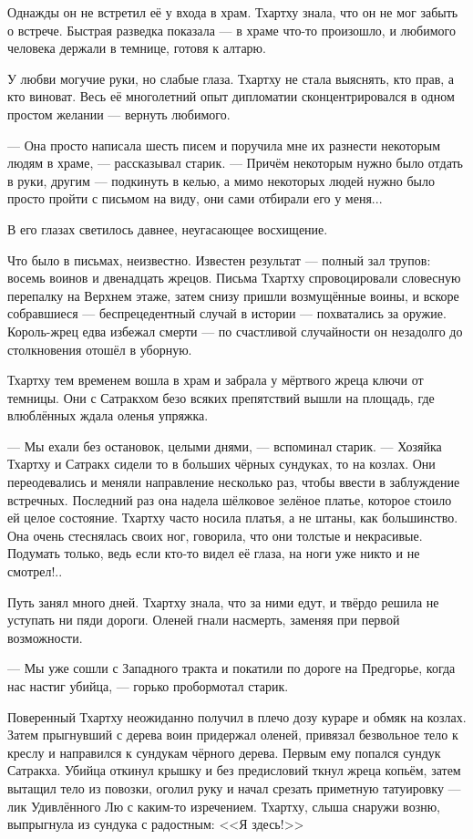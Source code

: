 Однажды он не встретил её у входа в храм.
Тхартху знала, что он не мог забыть о встрече.
Быстрая разведка показала --- в храме что-то произошло, и любимого человека держали в темнице, готовя к алтарю.

У любви могучие руки, но слабые глаза.
Тхартху не стала выяснять, кто прав, а кто виноват.
Весь её многолетний опыт дипломатии сконцентрировался в одном простом желании --- вернуть любимого.

--- Она просто написала шесть писем и поручила мне их разнести некоторым людям в храме, --- рассказывал старик.
--- Причём некоторым нужно было отдать в руки, другим --- подкинуть в келью, а мимо некоторых людей нужно было просто пройти с письмом на виду, они сами отбирали его у меня...

В его глазах светилось давнее, неугасающее восхищение.

Что было в письмах, неизвестно.
Известен результат --- полный зал трупов: восемь воинов и двенадцать жрецов.
Письма Тхартху спровоцировали словесную перепалку на Верхнем этаже, затем снизу пришли возмущённые воины, и вскоре собравшиеся --- беспрецедентный случай в истории --- похватались за оружие.
Король-жрец едва избежал смерти --- по счастливой случайности он незадолго до столкновения отошёл в уборную.

Тхартху тем временем вошла в храм и забрала у мёртвого жреца ключи от темницы.
Они с Сатракхом безо всяких препятствий вышли на площадь, где влюблённых ждала оленья упряжка.

--- Мы ехали без остановок, целыми днями, --- вспоминал старик.
--- Хозяйка Тхартху и Сатракх сидели то в больших чёрных сундуках, то на козлах.
Они переодевались и меняли направление несколько раз, чтобы ввести в заблуждение встречных.
Последний раз она надела шёлковое зелёное платье, которое стоило ей целое состояние.
Тхартху часто носила платья, а не штаны, как большинство.
Она очень стеснялась своих ног, говорила, что они толстые и некрасивые.
Подумать только, ведь если кто-то видел её глаза, на ноги уже никто и не смотрел!..

Путь занял много дней.
Тхартху знала, что за ними едут, и твёрдо решила не уступать ни пяди дороги.
Оленей гнали насмерть, заменяя при первой возможности.

--- Мы уже сошли с Западного тракта и покатили по дороге на Предгорье, когда нас настиг убийца, --- горько пробормотал старик.

Поверенный Тхартху неожиданно получил в плечо дозу кураре и обмяк на козлах.
Затем прыгнувший с дерева воин придержал оленей, привязал безвольное тело к креслу и направился к сундукам чёрного дерева.
Первым ему попался сундук Сатракха.
Убийца откинул крышку и без предисловий ткнул жреца копьём, затем вытащил тело из повозки, оголил руку и начал срезать приметную татуировку --- лик Удивлённого Лю с каким-то изречением.
Тхартху, слыша снаружи возню, выпрыгнула из сундука с радостным: <<Я здесь!>>

